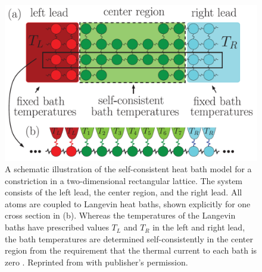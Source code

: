 \begin{figure}
\begin{center}
 \includegraphics[width=.99\columnwidth]{pics/schb_setup.pdf}
 \caption{A schematic illustration of the self-consistent heat bath model for a constriction in a two-dimensional rectangular lattice. The system consists of the left lead, the center region, and the right lead. All atoms are coupled to Langevin heat baths, shown explicitly for one cross section in (b). Whereas the temperatures of the Langevin baths have prescribed values $T_L$ and $T_R$ in the left and right lead, the bath temperatures are determined self-consistently in the center region from the requirement that the thermal current to each bath is zero \cite{bolsterli70}. Reprinted from  with publisher's permission.}
\label{fig:schb_setup}
\end{center}
\end{figure} 



